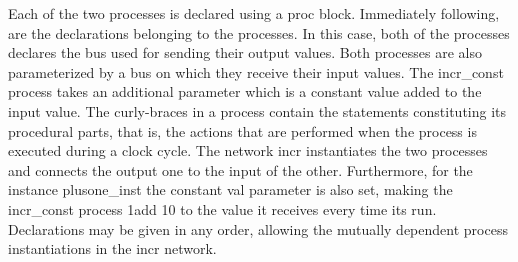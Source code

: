 Each of the two processes is declared using a {\ttfamily proc}
block. Immediately following, are the declarations belonging to the
processes. In this case, both of the processes declares the bus used for sending
their output values. Both processes are also parameterized by a bus on which
they receive their input values. The {\ttfamily incr\_const} process takes an
additional parameter which is a constant value added to the input value. The
curly-braces in a process contain the statements constituting its procedural
parts, that is, the actions that are performed when the process is executed
during a clock cycle. The network {\ttfamily incr} instantiates the two
processes and connects the output one to the input of the other. Furthermore,
for the instance {\ttfamily plusone\_inst} the constant {\ttfamily val}
parameter is also set, making the {\ttfamily incr\_const} process 1add 10 to the
value it receives every time its run. Declarations may be given in any order,
allowing the mutually dependent process instantiations in the {\ttfamily incr}
network.








